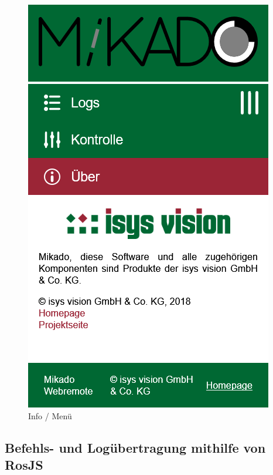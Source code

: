 \begin{figure}[H]
\begin{center}
\begin{minipage}{0.3\textwidth}
			\includegraphics[width=\textwidth]{media/webremote-info.png}
			\caption{Info / Menü}
			\label{fig:webtools-remote-design-info}
		\end{minipage}
	\end{center}
\end{figure}


\subsection{Befehls- und Logübertragung mithilfe von RosJS}
\label{subsec:webtools-remote-rosjs}

